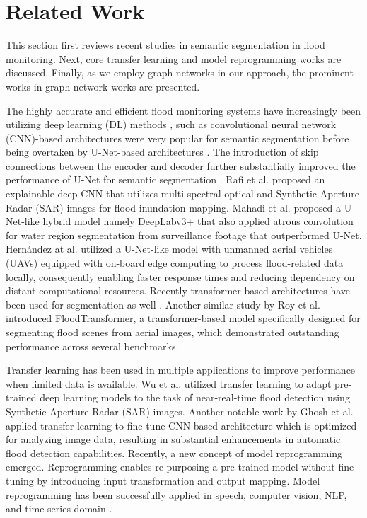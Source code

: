 \section{Related Work}
\label{sec:related}

This section first reviews recent studies in semantic segmentation in flood monitoring. Next, core transfer learning and model reprogramming works are discussed. Finally, as we employ graph networks in our approach, the prominent works in graph network works are presented.

The highly accurate and efficient flood monitoring systems have increasingly been utilizing deep learning (DL) methods \cite{xie2021segformer}, such as convolutional neural network (CNN)-based architectures were very popular for semantic segmentation before being overtaken by U-Net-based architectures \cite{U-Net}. The introduction of skip connections between the encoder and decoder further substantially improved the performance of U-Net for semantic segmentation \cite{maskrcnn}. Rafi et al. \cite{sanderson2023optimal} proposed an explainable deep CNN that utilizes multi-spectral optical and Synthetic Aperture Radar (SAR) images for flood inundation mapping.  Mahadi et al. proposed a U-Net-like hybrid model namely DeepLabv3+ that also applied atrous convolution for water region segmentation from surveillance footage \cite{muhadi2021deep} that outperformed U-Net. Hern{\'a}ndez at al. \cite{relw2} utilized a U-Net-like model with unmanned aerial vehicles (UAVs) equipped with on-board edge computing to process flood-related data locally, consequently enabling faster response times and reducing dependency on distant computational resources. Recently transformer-based architectures have been used for segmentation as well \cite{xie2021segformer}. Another similar study by Roy et al. \cite{roy2022transformer} introduced FloodTransformer, a transformer-based model specifically designed for segmenting flood scenes from aerial images, which demonstrated outstanding performance across several benchmarks.  

Transfer learning has been used in multiple applications to improve performance when limited data is available. Wu et al. \cite{wu2023near} utilized transfer learning to adapt pre-trained deep learning models to the task of near-real-time flood detection using Synthetic Aperture Radar (SAR) images. Another notable work by Ghosh et al. \cite{ghosh2022automatic} applied transfer learning to fine-tune CNN-based architecture which is optimized for analyzing image data, resulting in substantial enhancements in automatic flood detection capabilities. Recently, a new concept of model reprogramming emerged. Reprogramming enables re-purposing a pre-trained model without fine-tuning by introducing input transformation and output mapping\cite{chen2022model}. Model reprogramming has been successfully applied in speech, computer vision, NLP, and time series domain \cite{chen2022model}.

